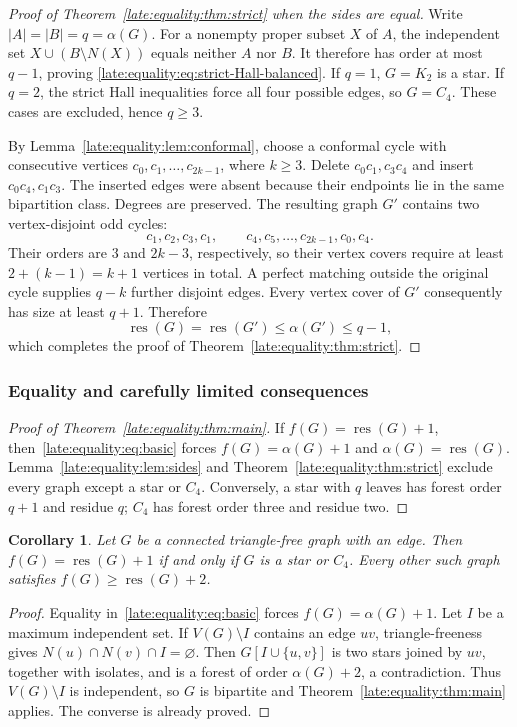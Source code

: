 \documentclass[11pt,a4paper]{article}
\newtheorem{corollary}[theorem]{Corollary}
\theoremstyle{definition}\newtheorem{definition}[theorem]{Definition}
\theoremstyle{remark}\newtheorem{remark}[theorem]{Remark}
\newcommand{\res}{\operatorname{res}}
\begin{document}
\begin{proof}[Proof of Theorem~\ref{late:equality:thm:strict} when the sides are equal]
Write $|A|=|B|=q=\alpha(G)$. For a nonempty proper subset $X$ of $A$,
the independent set $X\cup(B\setminus N(X))$ equals neither $A$ nor $B$.
It therefore has order at most $q-1$, proving
\eqref{late:equality:eq:strict-Hall-balanced}. If $q=1$, $G=K_2$ is a star. If $q=2$,
the strict Hall inequalities force all four possible edges, so $G=C_4$.
These cases are excluded, hence $q\ge3$.

By Lemma~\ref{late:equality:lem:conformal}, choose a conformal cycle with consecutive
vertices $c_0,c_1,\ldots,c_{2k-1}$, where $k\ge3$. Delete $c_0c_1,c_3c_4$
and insert $c_0c_4,c_1c_3$. The inserted edges were absent because their
endpoints lie in the same bipartition class. Degrees are preserved.
The resulting graph $G'$ contains two vertex-disjoint odd cycles:
\[
 c_1,c_2,c_3,c_1,
 \qquad
 c_4,c_5,\ldots,c_{2k-1},c_0,c_4.
\]
Their orders are $3$ and $2k-3$, respectively, so their vertex covers
require at least $2+(k-1)=k+1$ vertices in total. A perfect matching
outside the original cycle supplies $q-k$ further disjoint edges.
Every vertex cover of $G'$ consequently has size at least $q+1$.
Therefore
\[
 \res(G)=\res(G')\le\alpha(G')\le q-1,
\]
which completes the proof of Theorem~\ref{late:equality:thm:strict}.
\end{proof}

\subsubsection{Equality and carefully limited consequences}
\begin{proof}[Proof of Theorem~\ref{late:equality:thm:main}]
If $f(G)=\res(G)+1$, then~\eqref{late:equality:eq:basic} forces
$f(G)=\alpha(G)+1$ and $\alpha(G)=\res(G)$. Lemma~\ref{late:equality:lem:sides} and
Theorem~\ref{late:equality:thm:strict} exclude every graph except a star or $C_4$.
Conversely, a star with $q$ leaves has forest order $q+1$ and residue $q$;
$C_4$ has forest order three and residue two.
\end{proof}

\begin{corollary}\label{late:equality:cor:triangle-free}
Let $G$ be a connected triangle-free graph with an edge. Then
$f(G)=\res(G)+1$ if and only if $G$ is a star or $C_4$.
Every other such graph satisfies $f(G)\ge\res(G)+2$.
\end{corollary}
\begin{proof}
Equality in~\eqref{late:equality:eq:basic} forces $f(G)=\alpha(G)+1$.
Let $I$ be a maximum independent set. If $V(G)\setminus I$ contains an
edge $uv$, triangle-freeness gives $N(u)\cap N(v)\cap I=\varnothing$.
Then $G[I\cup\{u,v\}]$ is two stars joined by $uv$, together with
isolates, and is a forest of order $\alpha(G)+2$, a contradiction.
Thus $V(G)\setminus I$ is independent, so $G$ is bipartite and
Theorem~\ref{late:equality:thm:main} applies. The converse is already proved.
\end{proof}
\end{document}
